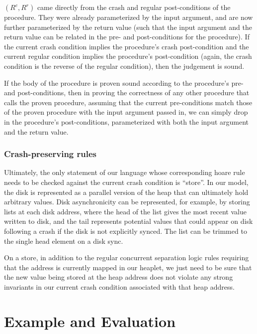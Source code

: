 $(R^c,R^r)$ came directly from the crash and regular post-conditions of the
procedure. They were already parameterized by the input argument, and are now
further parameterized by the return value (such that the input argument and the
return value can be related in the pre- and post-conditions for the procedure).
If the current crash condition implies the procedure's crash post-condition and
the current regular condition implies the procedure's post-condition (again, the
crash condition is the reverse of the regular condition), then the judgement is
sound.

If the body of the procedure is proven sound according to the procedure's pre-
and post-conditions, then in proving the correctness of any other procedure that calls
the proven procedure, assuming that the current pre-conditions
match those of the proven procedure with the input argument passed in,
we can simply drop in the procedure's post-conditions, parameterized with both
the input argument and the return value.

\subsubsection{Crash-preserving rules}


Ultimately, the only statement of our language whose corresponding hoare rule
needs to be checked against the current crash condition is ``store''. In our
model, the disk is represented as a parallel version of the heap that can
ultimately hold arbitrary values. Disk asynchronicity can be represented, for
example, by storing lists at each disk address, where the head of the list gives
the most recent value written to disk, and the tail represents potential values
that could appear on disk following a crash if the disk is not explicitly synced.
The list can be trimmed to the single head element on a disk sync.

On a store, in addition to the regular concurrent separation logic rules
requiring that the address is currently mapped in our heaplet, we just need to
be sure that the new value being stored at the heap address does not violate any
strong invariants in our current crash condition associated with that heap
address.

\section{Example and Evaluation}

